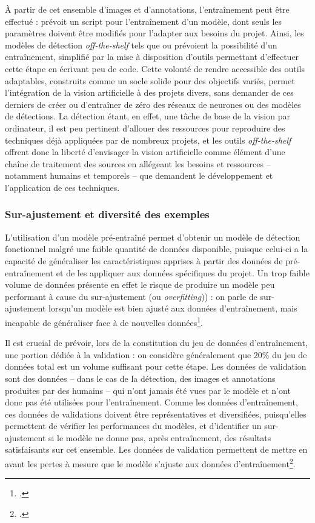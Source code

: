 	À partir de cet ensemble d'images et d'annotations, l'entraînement peut être effectué : \yolov prévoit un script pour l'entraînement d'un modèle, dont seuls les paramètres doivent être modifiés pour l'adapter aux besoins du projet. Ainsi, les modèles de détection \textit{off-the-shelf} tels que \yolo ou \docex prévoient la possibilité d'un entraînement, simplifié par la mise à disposition d'outils permettant d'effectuer cette étape en écrivant peu de code. Cette volonté de rendre accessible des outils adaptables, construits comme un socle solide pour des objectifs variés, permet l'intégration de la vision artificielle à des projets divers, sans demander de ces derniers de créer ou d'entraîner de zéro des réseaux de neurones ou des modèles de détections. La détection étant, en effet, une tâche de base de la vision par ordinateur, il est peu pertinent d'allouer des ressources pour reproduire des techniques déjà appliquées par de nombreux projets, et les outils \textit{off-the-shelf} offrent donc la liberté d'envisager la vision artificielle comme élément d'une chaîne de traitement des sources en allégeant les besoins et ressources -- notamment humains et temporels -- que demandent le développement et l'application de ces techniques. 

    \subsubsection{Sur-ajustement et diversité des exemples}
	
	L'utilisation d'un modèle pré-entraîné permet d'obtenir un modèle de détection fonctionnel malgré une faible quantité de données disponible, puisque celui-ci a la capacité de généraliser les caractéristiques apprises à partir des données de pré-entraînement et de les appliquer aux données spécifiques du projet. Un trop faible volume de données présente en effet le risque de produire un modèle peu performant à cause du sur-ajustement (ou \textit{overfitting})) : on parle de sur-ajustement lorsqu'un modèle est bien ajusté aux données d'entraînement, mais incapable de généraliser face à de nouvelles données\footcite{cholletApprentissageProfondAvec2020a}. 
	
	Il est crucial de prévoir, lors de la constitution du jeu de données d'entraînement, une portion dédiée à la validation : on considère généralement que 20\% du jeu de données total est un volume suffisant pour cette étape. Les données de validation sont des données -- dans le cas de la détection, des images et annotations produites par des humains -- qui n'ont jamais été vues par le modèle et n'ont donc pas été utilisées pour l'entraînement. Comme les données d'entraînement, ces données de validations doivent être représentatives et diversifiées, puisqu'elles permettent de vérifier les performances du modèles, et d'identifier un sur-ajustement si le modèle ne donne pas, après entraînement, des résultats satisfaisants sur cet ensemble. Les données de validation permettent de mettre en avant les pertes à mesure que le modèle s'ajuste aux données d'entraînement\footcite{carremansHandlingOverfittingDeep2019}.
	
